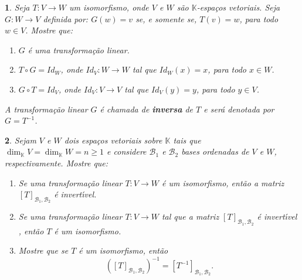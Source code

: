 \documentclass[12pt]{exam}
\newtheorem{exercicio}{}
\newcommand{\cp}[1]{\mathbb{#1}}
\begin{document}
\begin{exercicio}
  Seja $T : V \to W$ um isomorfismo, onde $V$ e $W$ s\~ao $\cp{K}$-espa\c{c}os vetoriais. Seja $G : W \to V$ definida por: $G(w) = v$ se, e somente se, $T(v) = w$, para todo $w \in V$. Mostre que:
  \begin{enumerate}[label=({\alph*})]
    \item $G$ \'e uma transforma\c{c}\~ao linear.
    \item $T\circ G = Id_W$, onde $Id_V : W \to W$ tal que $Id_W(x) = x$, para todo $x \in W$.
    \item $G\circ T = Id_V$, onde $Id_V : V \to V$ tal que $Id_V(y) = y$, para todo $y \in V$.
  \end{enumerate}
  A transforma\c{c}\~ao linear $G$ \'e chamada de \textbf{inversa} de $T$ e ser\'a denotada por $G = T^{-1}$.
\end{exercicio}

\begin{exercicio}
  Sejam $V$ e $W$ dois espa\c{c}os vetoriais sobre $\cp{K}$ tais que $\dim_\cp{K}V = \dim_\cp{K}W = n \ge 1$ e considere $\mathcal{B}_1$ e $\mathcal{B}_2$ bases ordenadas de $V$ e $W$, respectivamente. Mostre que:
  \begin{enumerate}[label=({\alph*})]
    \item Se uma transforma\c{c}\~ao linear $T : V \to W$ \'e um isomorfismo, ent\~ao a matriz $[T]_{\mathcal{B}_1,\mathcal{B}_2}$ \'e invert{\'\i}vel.
    \item Se uma transforma\c{c}\~ao linear $T : V \to W$ tal que a matriz $[T]_{\mathcal{B}_1,\mathcal{B}_2}$ \'e invert{\'\i}vel , ent\~ao $T$ \'e um isomorfismo.
    \item Mostre que se $T$ \'e um isomorfismo, ent\~ao
    \[
      \left([T]_{\mathcal{B}_1,\mathcal{B}_2}\right)^{-1} = [T^{-1}]_{\mathcal{B}_1,\mathcal{B}_2}.
    \]
  \end{enumerate}
\end{exercicio}
\end{document}
